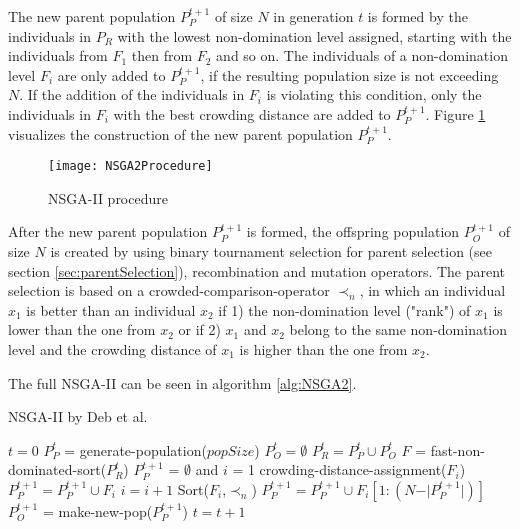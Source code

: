     The new parent population $P_{P}^{t+1}$ of size $N$ in generation $t$ is formed by the individuals in $P_R$ with the lowest non-domination level assigned, starting with the individuals from $F_1$ then from $F_2$ and so on. The individuals of a non-domination level $F_i$ are only added to $P_{P}^{t+1}$, if the resulting population size is not exceeding $N$. If the addition of the individuals in $F_i$ is violating this condition, only the individuals in $F_i$ with the best crowding distance are added to $P_{P}^{t+1}$. Figure \ref{fig:nsga2procedure} visualizes the construction of the new parent population $P_{P}^{t+1}$.
    
    \begin{figure}
        \centering
        \texttt{[image: NSGA2Procedure]}
        \caption{NSGA-II procedure\cite{Deb:2002}}
        \label{fig:nsga2procedure}
    \end{figure}
    
    After the new parent population $P_{P}^{t+1}$ is formed, the offspring population $P_{O}^{t+1}$ of size $N$ is created by using binary tournament selection for parent selection (see section \ref{sec:parentSelection}), recombination and mutation operators. The parent selection is based on a crowded-comparison-operator $\prec_n$, in which an individual $x_1$ is better than an individual $x_2$ if 1) the non-domination level ("rank") of $x_1$ is lower than the one from $x_2$ or if 2) $x_1$ and $x_2$ belong to the same non-domination level and the crowding distance of $x_1$ is higher than the one from $x_2$.
    
    The full NSGA-II can be seen in algorithm \ref{alg:NSGA2}.
    
    \begin{algorithm}
        \caption{NSGA-II by Deb et al.\cite{Deb:2002}}
        \label{alg:NSGA2}
        \begin{algorithmic}[1]
                \State $t = 0$
                \State $P_{P}^{t}$ = generate-population($popSize$)
                \State $P_{O}^{t} = \emptyset$
                    \State $P_{R}^{t} = P_{P}^{t} \cup P_{O}^{t}$
                    \State $F$ = fast-non-dominated-sort($P_{R}^{t}$)
                    \State $P_{P}^{t+1}$ = $\emptyset$ and $i$ = 1
                        \State crowding-distance-assignment($F_i$)
                        \State $P_{P}^{t+1} = P_{P}^{t+1} \cup F_i$
                        \State $i = i + 1$
                    \EndWhile
                    \State Sort($F_i$,$\prec_n$)
                    \State $P_{P}^{t+1} = P_{P}^{t+1} \cup F_i[1:(N-\vert P_{P}^{t+1} \vert)]$
                    \State $P_{O}^{t+1}$ = make-new-pop($P_{P}^{t+1}$)
                    \State $t = t + 1$
                \EndWhile
            \EndProcedure
        \end{algorithmic}
    \end{algorithm}
    

